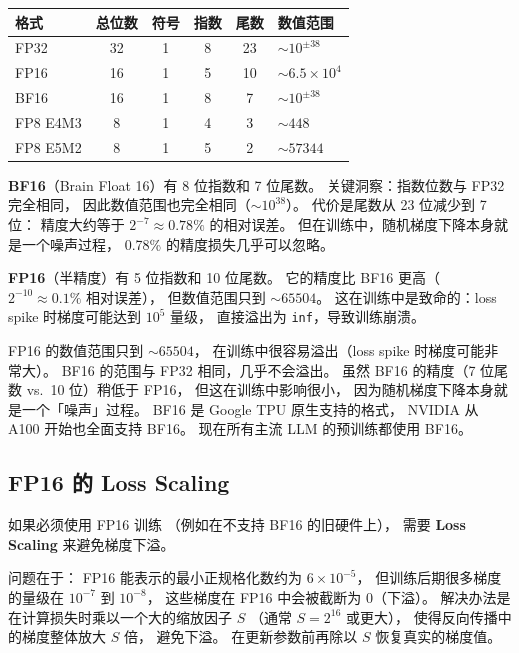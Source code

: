 \begin{center}\small
\renewcommand{\arraystretch}{1.3}
\begin{tabular}{lccccl}
  \toprule
  \rowcolor{figLightGray}
  \textbf{格式} & \textbf{总位数} & \textbf{符号} & \textbf{指数} & \textbf{尾数}
  & \textbf{数值范围} \\
  \midrule
  FP32 & 32 & 1 & 8 & 23 & $\sim 10^{\pm 38}$ \\
  FP16 & 16 & 1 & 5 & 10 & $\sim 6.5 \times 10^4$ \\
  BF16 & 16 & 1 & 8 & 7 & $\sim 10^{\pm 38}$ \\
  FP8 E4M3 & 8 & 1 & 4 & 3 & $\sim 448$ \\
  FP8 E5M2 & 8 & 1 & 5 & 2 & $\sim 57344$ \\
  \bottomrule
\end{tabular}
\end{center}

\textbf{BF16}（Brain Float 16）有 8 位指数和 7 位尾数。
关键洞察：指数位数与 FP32 完全相同，
因此数值范围也完全相同（$\sim 10^{38}$）。
代价是尾数从 23 位减少到 7 位：
精度大约等于 $2^{-7} \approx 0.78\%$ 的相对误差。
但在训练中，随机梯度下降本身就是一个噪声过程，
0.78\% 的精度损失几乎可以忽略。

\textbf{FP16}（半精度）有 5 位指数和 10 位尾数。
它的精度比 BF16 更高（$2^{-10} \approx 0.1\%$ 相对误差），
但数值范围只到 $\sim 65504$。
这在训练中是致命的：loss spike 时梯度可能达到 $10^5$ 量级，
直接溢出为 \texttt{inf}，导致训练崩溃。

\begin{whybox}[为什么 BF16 优于 FP16？]
FP16 的数值范围只到 $\sim 65504$，
在训练中很容易溢出（loss spike 时梯度可能非常大）。
BF16 的范围与 FP32 相同，几乎不会溢出。
虽然 BF16 的精度（7 位尾数 vs.\ 10 位）稍低于 FP16，
但这在训练中影响很小，
因为随机梯度下降本身就是一个「噪声」过程。
BF16 是 Google TPU 原生支持的格式，
NVIDIA 从 A100 开始也全面支持 BF16。
现在所有主流 LLM 的预训练都使用 BF16。
\end{whybox}

\subsection{FP16 的 Loss Scaling}

如果必须使用 FP16 训练
（例如在不支持 BF16 的旧硬件上），
需要 \textbf{Loss Scaling} 来避免梯度下溢。

问题在于：
FP16 能表示的最小正规格化数约为 $6 \times 10^{-5}$，
但训练后期很多梯度的量级在 $10^{-7}$ 到 $10^{-8}$，
这些梯度在 FP16 中会被截断为 0（下溢）。
解决办法是在计算损失时乘以一个大的缩放因子 $S$
（通常 $S = 2^{16}$ 或更大），
使得反向传播中的梯度整体放大 $S$ 倍，
避免下溢。
在更新参数前再除以 $S$ 恢复真实的梯度值。

